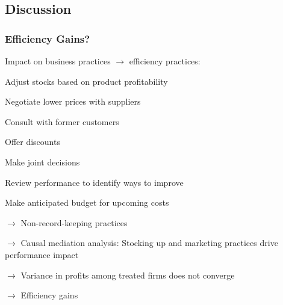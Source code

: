 \documentclass[hideothersubsections, usenames,dvipsnames,11pt]{beamer}
\newenvironment{itemize_2pt}{\itemize\addtolength{\itemsep}{2pt}}{\enditemize}
\begin{document}
\subsection{Discussion}
\begin{frame}
\frametitle{Efficiency Gains?}
Impact on business practices $\rightarrow$ \textcolor{bdf}{efficiency practices}:
\vspace{0.1in}
\begin{itemize_2pt}
	\item Adjust stocks based on product profitability
	\item Negotiate lower prices with suppliers
	\item Consult with former customers
	\item Offer discounts
	\item Make joint decisions
	\item Review performance to identify ways to improve
	\item Make anticipated budget for upcoming costs

	\pause
	
	\item[] $\rightarrow$ \textcolor{bdf}{Non-record-keeping practices}
	\item[] $\rightarrow$ Causal mediation analysis: \textcolor{bdf}{Stocking up and marketing practices} drive performance impact
	\item[] $\rightarrow$ Variance in profits among treated firms does not converge
	\item[] $\rightarrow$ \textcolor{bdf}{Efficiency gains}
\end{itemize_2pt}
\end{frame}
\end{document}
